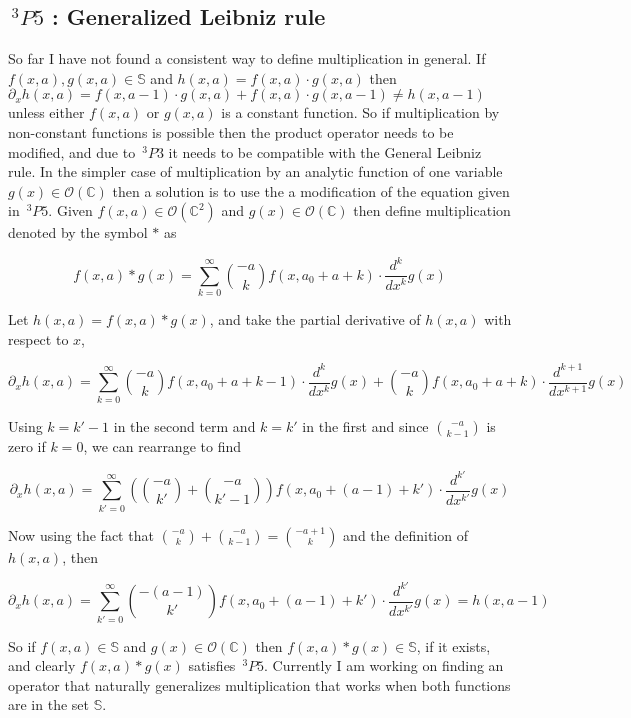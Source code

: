 \documentclass[%
 onecolumn,
 amsmath, amssymb, aps, pra, 10pt
]{revtex4-2}
\begin{document}
\subsection*{$\,^3P5$ : Generalized Leibniz rule}
So far I have not found a consistent way to define multiplication in general. If $f(x, a), g(x, a) \in \mathbb{S}$ and $h(x, a) = f(x, a) \cdot g(x, a)$ then $\partial_x h(x, a) = f(x, a - 1) \cdot g(x, a) + f(x, a) \cdot g(x, a - 1) \neq h(x, a - 1)$ unless either $f(x, a)$ or $g(x, a)$ is a constant function. So if multiplication by non-constant functions is possible then the product operator needs to be modified, and due to $\,^3P3$ it needs to be compatible with the General Leibniz rule. In the simpler case of multiplication by an analytic function of one variable $g(x) \in \mathcal{O}(\mathbb{C})$ then a solution is to use the a modification of the equation given in $\,^3P5$. Given $f(x, a) \in \mathcal{O}(\mathbb{C}^2)$ and $g(x) \in \mathcal{O}(\mathbb{C})$ then define multiplication denoted by the symbol $*$ as

\begin{equation}
f(x, a) * g(x) = \sum_{k=0}^{\infty} \binom{-a}{k}f(x, a_0 + a + k) \cdot \frac{d^k}{dx^k} g(x)
\label{multiplication}
\end{equation}

Let $h(x, a) = f(x, a) * g(x)$, and take the partial derivative of $h(x, a)$ with respect to $x$,

$$\partial_x h(x, a) = \sum_{k=0}^{\infty} \binom{-a}{k}f(x, a_0 + a + k - 1) \cdot \frac{d^k}{dx^k} g(x) + \binom{-a}{k}f(x, a_0 + a + k) \cdot \frac{d^{k + 1}}{dx^{k + 1}} g(x)$$

Using $k = k' - 1$ in the second term and $k = k'$ in the first and since $\binom{-a}{k-1}$ is zero if $k=0$, we can rearrange to find

$$\partial_x h(x, a) = \sum_{k'=0}^{\infty} \left( \binom{-a}{k'} + \binom{-a}{k' - 1} \right)f(x, a_0 + (a - 1) + k') \cdot \frac{d^{k'}}{dx^{k'}} g(x)$$

Now using the fact that $\binom{-a}{k} + \binom{-a}{k - 1} = \binom{-a + 1}{k}$ and the definition of $h(x, a)$, then 

$$\partial_x h(x, a) = \sum_{k'=0}^{\infty} \binom{-(a - 1)}{k'}f(x, a_0 + (a - 1) + k') \cdot \frac{d^{k'}}{dx^{k'}} g(x) = h(x, a - 1)$$

So if $f(x, a) \in \mathbb{S}$ and $g(x) \in \mathcal{O}(\mathbb{C})$ then $f(x, a) * g(x) \in \mathbb{S}$, if it exists, and clearly $f(x, a) * g(x)$ satisfies $\,^3P5$. Currently I am working on finding an operator that naturally generalizes multiplication that works when both functions are in the set $\mathbb{S}$.
\end{document}
